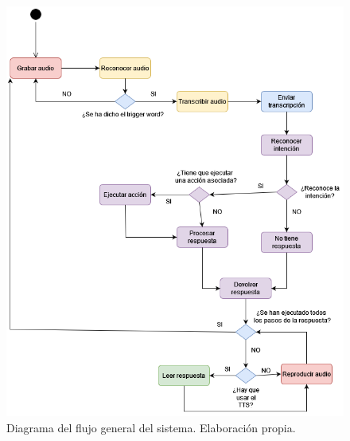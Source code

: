  
 \begin{figure}[H]
 	\includegraphics[width=\textwidth]{imagenes/DiagramaFlujo.png}
 	\caption{Diagrama del flujo general del sistema. Elaboración propia.}
 	\label{fig:diagramaflujo}
 \end{figure}

 
